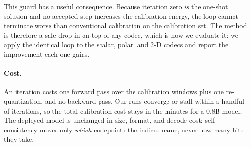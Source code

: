This guard has a useful consequence. Because iteration zero \emph{is} the
one-shot solution and no accepted step increases the calibration energy, the
loop cannot terminate worse than conventional calibration on the calibration
set. The method is therefore a safe drop-in on top of any codec, which is how
we evaluate it: we apply the identical loop to the scalar, polar, and 2-D
codecs and report the improvement each one gains.

\paragraph{Cost.} An iteration costs one forward pass over the calibration
windows plus one re-quantization, and no backward pass. Our runs converge or
stall within a handful of iterations, so the total calibration cost stays in
the minutes for a 0.8B model. The deployed model is unchanged in size, format,
and decode cost: self-consistency moves only \emph{which} codepoints the
indices name, never how many bits they take.
